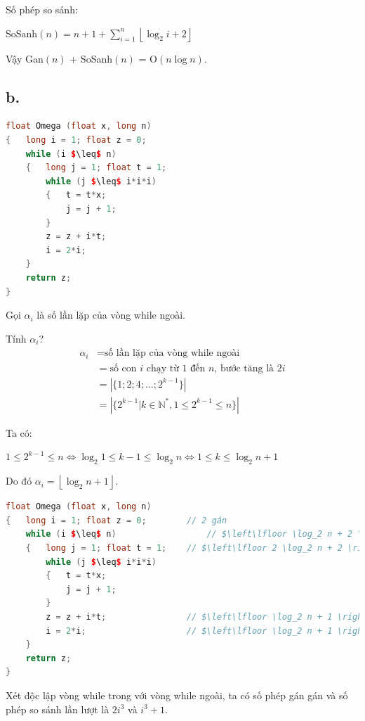 \documentclass[12pt, a4paper, fleqn]{article}
\begin{document}
	Số phép so sánh:
	
	SoSanh$\displaystyle (n) = n + 1 + \sum_{i = 1}^n \left\lfloor \log_2 i + 2 \right\rfloor$
	
	Vậy Gan$(n)$ + SoSanh$(n)$ = O$(n \log n)$.
	
	\subsection*{b.}
	
	\begin{lstlisting}[language = C++, mathescape]
float Omega (float x, long n)
{	long i = 1; float z = 0;
	while (i $\leq$ n)
	{	long j = 1; float t = 1;
		while (j $\leq$ i*i*i)
		{	t = t*x;
			j = j + 1;
		}
		z = z + i*t;
		i = 2*i;
	}
	return z;
}
\end{lstlisting}

	Gọi $\alpha_i$ là số lần lặp của vòng while ngoài.
	
	Tính $\alpha_i$?
	\begin{align*}
		\alpha_i &= \text{số lần lặp của vòng while ngoài} \\
				 &= \text{số con $i$ chạy từ 1 đến $n$, bước tăng là $2i$} \\
				 &= \left| \{ 1; 2; 4; ...; 2^{k - 1} \} \right| \\
				 &= \left| \{ 2^{k - 1} | k \in \mathbb{N^*}, 1 \leq 2^{k - 1} \leq n\} \right| 
	\end{align*}
	
	Ta có:
	
	$1 \leq 2^{k - 1} \leq n \Leftrightarrow \log_2 1 \leq k - 1 \leq \log_2 n \Leftrightarrow 1 \leq k \leq \log_2 n + 1$
	
	Do đó $\alpha_i = \left\lfloor \log_2 n + 1 \right\rfloor$.
	
	\begin{lstlisting}[language = C++, mathescape, texcl]
float Omega (float x, long n)
{	long i = 1; float z = 0;		// 2 gán
	while (i $\leq$ n)					// $\left\lfloor \log_2 n + 2 \right\rfloor$ so sánh
	{	long j = 1; float t = 1;	// $\left\lfloor 2 \log_2 n + 2 \right\rfloor$ gán
		while (j $\leq$ i*i*i)
		{	t = t*x;
			j = j + 1;
		}
		z = z + i*t;				// $\left\lfloor \log_2 n + 1 \right\rfloor$ gán
		i = 2*i;					// $\left\lfloor \log_2 n + 1 \right\rfloor$ gán
	}
	return z;
}
	\end{lstlisting}
	
	Xét độc lập vòng while trong với vòng while ngoài, ta có số phép gán gán và số phép so sánh lần lượt là $2i^3$ và $i^3 + 1$.
	
\end{document}
